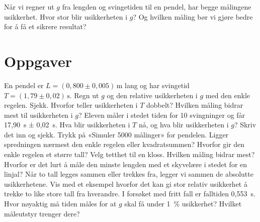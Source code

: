 \documentclass[11pt]{article}
\begin{document}

Når vi regner ut $g$ fra lengden og svingetiden til en pendel, har begge målingene usikkerhet. Hvor stor blir usikkerheten i $g$? Og hvilken måling bør vi gjøre bedre for å få et sikrere resultat?

\section*{Oppgaver}

\begin{oppgaveliste}
\oppgave {}En pendel er $L = (0{,}800 \pm  0{,}005)\,\mathrm{m}$ lang og har svingetid $T = (1{,}79 \pm  0{,}02)\,\mathrm{s}$. Regn ut $g$ og den relative usikkerheten i $g$ med den enkle regelen. Sjekk.
\svar
\oppgave {}Hvorfor teller usikkerheten i $T$ dobbelt? Hvilken måling bidrar mest til usikkerheten i $g$?
\svar
\oppgave {}Eleven måler i stedet tiden for 10 svingninger og får 17,90~s ± 0,02~s. Hva blir usikkerheten i $T$ nå, og hva blir usikkerheten i $g$? Skriv det inn og sjekk.
\svar
\oppgave {}Trykk på «Simuler 5000 målinger» for pendelen. Ligger spredningen nærmest den enkle regelen eller kvadratsummen? Hvorfor gir den enkle regelen et større tall?
\svar
\oppgave {}Velg tetthet til en kloss. Hvilken måling bidrar mest? Hvorfor er det lurt å måle den minste lengden med et skyvelære i stedet for en linjal?
\svar
\oppgave {}Når to tall legges sammen eller trekkes fra, legger vi sammen de absolutte usikkerhetene. Vis med et eksempel hvorfor det kan gi stor relativ usikkerhet å trekke to like store tall fra hverandre.
\svar
\oppgave {}I forsøket med fritt fall er falltiden 0,553~s. Hvor nøyaktig må tiden måles for at $g$ skal få under 1~\% usikkerhet? Hvilket måleutstyr trenger dere?
\svar
\end{oppgaveliste}
\end{document}
